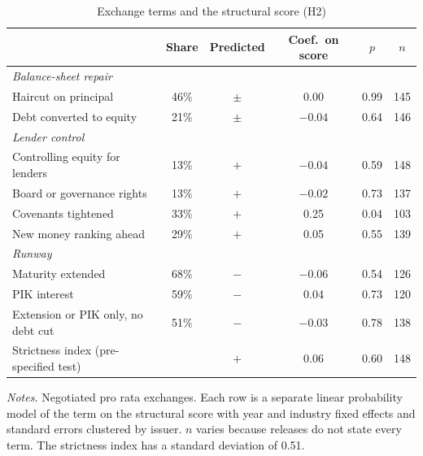 \begin{table}[H]
\centering
\caption{Exchange terms and the structural score (H2)}
\label{tab:h2}
\small
\begin{tabular}{l c c c c c}
\toprule
 & Share & Predicted & Coef.\ on score & $p$ & $n$ \\
\midrule
\textit{Balance-sheet repair} & & & & & \\
\quad Haircut on principal & 46\% & $\pm$ & 0.00 & 0.99 & 145 \\
\quad Debt converted to equity & 21\% & $\pm$ & $-0.04$ & 0.64 & 146 \\
\textit{Lender control} & & & & & \\
\quad Controlling equity for lenders & 13\% & $+$ & $-0.04$ & 0.59 & 148 \\
\quad Board or governance rights & 13\% & $+$ & $-0.02$ & 0.73 & 137 \\
\quad Covenants tightened & 33\% & $+$ & 0.25 & 0.04 & 103 \\
\quad New money ranking ahead & 29\% & $+$ & 0.05 & 0.55 & 139 \\
\textit{Runway} & & & & & \\
\quad Maturity extended & 68\% & $-$ & $-0.06$ & 0.54 & 126 \\
\quad PIK interest & 59\% & $-$ & 0.04 & 0.73 & 120 \\
\quad Extension or PIK only, no debt cut & 51\% & $-$ & $-0.03$ & 0.78 & 138 \\
\addlinespace
Strictness index (pre-specified test) & & $+$ & 0.06 & 0.60 & 148 \\
\bottomrule
\end{tabular}
\begin{minipage}{0.92\textwidth}\vspace{4pt}\footnotesize
\textit{Notes.} Negotiated pro rata exchanges. Each row is a separate linear probability model of the term on the structural score with year and industry fixed effects and standard errors clustered by issuer. $n$ varies because releases do not state every term. The strictness index has a standard deviation of 0.51.
\end{minipage}
\end{table}
